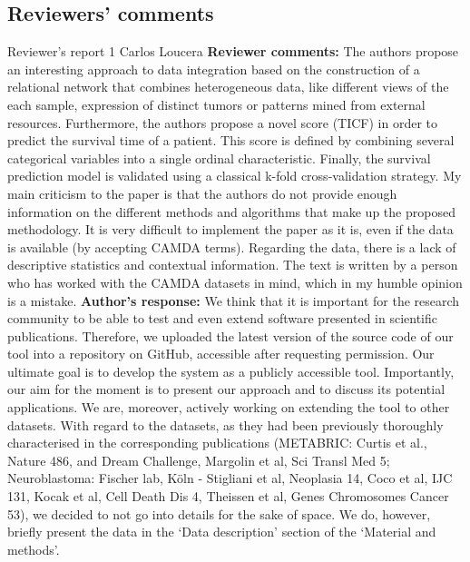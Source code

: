 \documentclass{bmcart}
\begin{document}
\begin{backmatter}
\section*{Reviewers' comments}
\newline Reviewer's report 1
\newline Carlos Loucera
\newline \textbf{Reviewer comments:}
 The authors propose an interesting approach to data integration based on the construction of a relational network that combines heterogeneous data, like different views of the each sample, expression of distinct tumors or patterns mined from external resources. Furthermore, the authors propose a novel score (TICF) in order to predict the survival time of a patient. This score is defined by combining several categorical variables into a single ordinal characteristic. Finally, the survival prediction model is validated using a classical k-fold cross-validation strategy. My main criticism to the paper is that the authors do not provide enough information on the different methods and algorithms that make up the proposed methodology. It is very difficult to implement the paper as it is, even if the data is available (by accepting CAMDA terms). Regarding the data, there is a lack of descriptive statistics and contextual information. The text is written by a person who has worked with the CAMDA datasets in mind, which in my humble opinion is a mistake.
\newline \textbf{Author's response:}
We think that it is important for the research community to be able to test and even extend software presented in scientific publications. Therefore, we uploaded the latest version of the source code of our tool into a repository on GitHub, accessible after requesting permission. Our ultimate goal is to develop the system as a publicly accessible tool. Importantly, our aim for the moment is to present our approach and to discuss its potential applications. We are, moreover, actively working on extending the tool to other datasets.
With regard to the datasets, as they had been previously thoroughly characterised in the corresponding publications (METABRIC: Curtis et al., Nature 486, and Dream Challenge, Margolin et al, Sci Transl Med 5; Neuroblastoma: Fischer lab, Köln - Stigliani et al, Neoplasia 14, Coco et al, IJC 131, Kocak et al, Cell Death Dis 4, Theissen et al, Genes Chromosomes Cancer 53), we decided to not go into details for the sake of space. We do, however, briefly present the data in the ‘Data description’ section of the ‘Material and methods’.


\end{backmatter}
\end{document}
